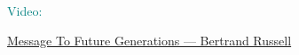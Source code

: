 
\begin{frame}{}
  \centerline{\Large \textcolor{teal}{Video:}}
  \vspace{0.20cm}
  \centerline{\large \textcolor{teal}{\href{https://www.youtube.com/watch?v=HXuvEeecZtU}{Message To Future Generations --- Bertrand Russell}}}
\end{frame}
